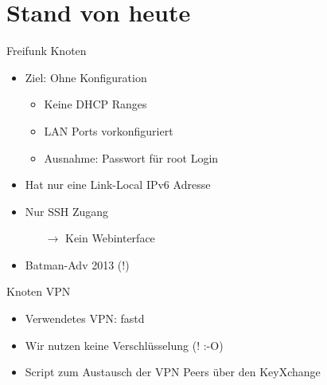 \section{Stand von heute}

\begin{frame}{Freifunk Knoten}
    \begin{itemize}
        \item Ziel: Ohne Konfiguration
        \begin{itemize}
            \item Keine DHCP Ranges
            \item LAN Ports vorkonfiguriert
            \item Ausnahme: Passwort für root Login
        \end{itemize}
        \item Hat nur eine Link-Local IPv6 Adresse
        \item Nur SSH Zugang
        \begin{itemize}
            \item[$\rightarrow$] Kein Webinterface
        \end{itemize}
        \item Batman-Adv 2013 (!)
    \end{itemize}
\end{frame}

\begin{frame}{Knoten VPN}
    \begin{itemize}
        \item Verwendetes VPN: fastd
        \item Wir nutzen keine Verschlüsselung (! :-O)
        \item Script zum Austausch der VPN Peers über den KeyXchange
    \end{itemize}
\end{frame}

